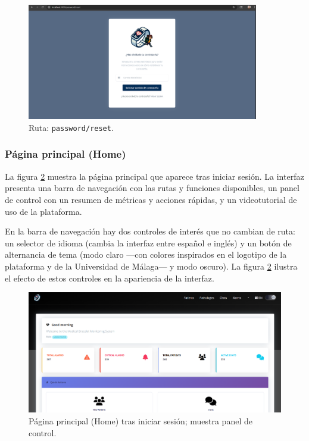 \documentclass[12pt, a4paper]{article}
\begin{document}
\begin{umaappendices}
	\begin{figure}[htbp]
		\centering
		\includegraphics[width=0.9\textwidth]{images/2_olvide.png}
		\caption[Ejemplo]{Ruta: \texttt{password/reset}.}
		\label{fig:olvide}
	\end{figure}
	
	\subsubsection{Página principal (Home)}
	La figura \ref{fig:alter} muestra la página principal que aparece tras iniciar sesión. La interfaz presenta una barra de navegación con las rutas y funciones disponibles, un panel de control con un resumen de métricas y acciones rápidas, y un videotutorial de uso de la plataforma.
	
	En la barra de navegación hay dos controles de interés que no cambian de ruta: un selector de idioma (cambia la interfaz entre español e inglés) y un botón de alternancia de tema (modo claro —con colores inspirados en el logotipo de la plataforma y de la Universidad de Málaga— y modo oscuro). La figura \ref{fig:alter} ilustra el efecto de estos controles en la apariencia de la interfaz.
	
	\begin{figure}[htbp]
		\centering
		\includegraphics[width=1\textwidth]{images/3_home.png}
		\caption[Ejemplo]{Página principal (Home) tras iniciar sesión; muestra panel de control.}
		\label{fig:alter}
	\end{figure}
	

\end{umaappendices}
\end{document}
